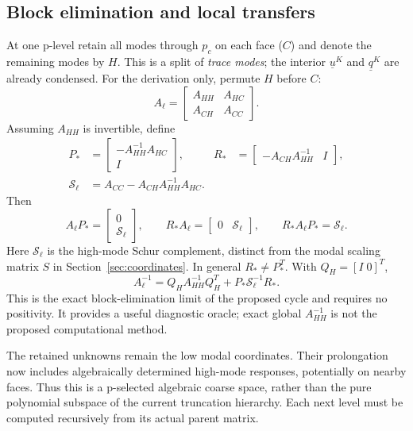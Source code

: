 \documentclass[11pt]{article}
\numberwithin{equation}{section}
\numberwithin{figure}{section}
\numberwithin{table}{section}
\begin{document}
\subsection{Block elimination and local transfers}
At one p-level retain all modes through $p_c$ on each face ($C$) and denote
the remaining modes by $H$. This is a split of \emph{trace modes}; the
interior $\underline{u}^K$ and $\underline{q}^K$ are already condensed.
For the derivation only, permute $H$ before $C$:
\[
 A_\ell=\begin{bmatrix}A_{HH}&A_{HC}\\A_{CH}&A_{CC}\end{bmatrix}.
\]
Assuming $A_{HH}$ is invertible, define
\begin{align*}
 P_*&=\begin{bmatrix}-A_{HH}^{-1}A_{HC}\\I\end{bmatrix},&
 R_*&=\begin{bmatrix}-A_{CH}A_{HH}^{-1}&I\end{bmatrix},\\
 \mathcal S_\ell&=A_{CC}-A_{CH}A_{HH}^{-1}A_{HC}.&&
\end{align*}
Then
\[
 A_\ell P_*=\begin{bmatrix}0\\\mathcal S_\ell\end{bmatrix},\qquad
 R_*A_\ell=\begin{bmatrix}0&\mathcal S_\ell\end{bmatrix},\qquad
 R_*A_\ell P_*=\mathcal S_\ell.
\]
Here $\mathcal S_\ell$ is the high-mode Schur complement, distinct from the
modal scaling matrix $S$ in Section~\ref{sec:coordinates}.
In general $R_*\ne P_*^T$. With $Q_H=[I\;0]^T$,
\begin{equation}\label{eq:exact}
 A_\ell^{-1}=Q_HA_{HH}^{-1}Q_H^T+P_*\mathcal S_\ell^{-1}R_*.
\end{equation}
This is the exact block-elimination limit of the proposed cycle and requires
no positivity. It provides a useful diagnostic oracle; exact global
$A_{HH}^{-1}$ is not the proposed computational method.

The retained unknowns remain the low modal coordinates. Their prolongation
now includes algebraically determined high-mode responses, potentially on
nearby faces. Thus this is a p-selected algebraic coarse space, rather than
the pure polynomial subspace of the current truncation hierarchy. Each next
level must be computed recursively from its actual parent matrix.
\end{document}
